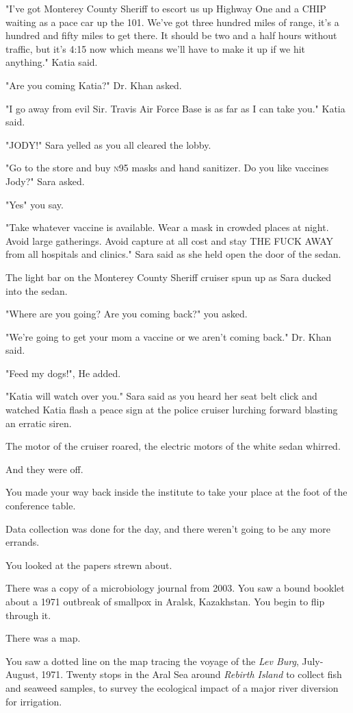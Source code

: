 \documentclass[a5paper, symmetric]{tufte-book}
\begin{document}
"I've got Monterey County Sheriff to escort us up Highway One and a CHIP waiting as a pace car up the 101. We've got three hundred miles of range, it's a hundred and fifty miles to get there. It should be two and a half hours without traffic, but it's 4:15 now which means we'll have to make it up if we hit anything." Katia said. 

"Are you coming Katia?" Dr. Khan asked. 

"I go away from evil Sir. Travis Air Force Base is as far as I can take you." Katia said. 

"JODY!" Sara yelled as you all cleared the lobby. 

"Go to the store and buy \textsc{n}95 masks and hand sanitizer. Do you like vaccines Jody?" Sara asked.

"Yes" you say. 

"Take whatever vaccine is available. Wear a mask in crowded places at night. Avoid large gatherings. Avoid capture at all cost and stay THE FUCK AWAY from all hospitals and clinics." Sara said as she held open the door of the sedan. 

The light bar on the Monterey County Sheriff cruiser spun up as Sara ducked into the sedan.

"Where are you going? Are you coming back?" you asked. 

"We're going to get your mom a vaccine or we aren't coming back." Dr. Khan said. 

"Feed my dogs!", He added.

"Katia will watch over you." Sara said as you heard her seat belt click and watched Katia flash a peace sign at the police cruiser lurching forward blasting an erratic siren. 

The motor of the cruiser roared, the electric motors of the white sedan whirred. 

And they were off. 

You made your way back inside the institute to take your place at the foot of the conference table. 

Data collection was done for the day, and there weren't going to be any more errands.

You looked at the papers strewn about. 

There was a copy of a microbiology journal from 2003. You saw a bound booklet about a 1971 outbreak of smallpox in Aralsk, Kazakhstan. You begin to flip through it. 

There was a map.

You saw a dotted line on the map tracing the voyage of the \textit{Lev Burg}, July-August, 1971. Twenty stops in the Aral Sea around \textit{Rebirth Island} to collect fish and seaweed samples, to survey the ecological impact of a major river diversion for irrigation.
\end{document}

